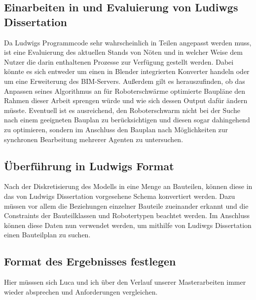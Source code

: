 \subsection{Einarbeiten in und Evaluierung von Ludiwgs Dissertation}
Da Ludwigs Programmcode sehr wahrscheinlich in Teilen angepasst werden muss, ist eine Evaluierung des aktuellen Stands von Nöten und in welcher Weise dem Nutzer die darin enthaltenen Prozesse zur Verfügung gestellt werden.
Dabei könnte es sich entweder um einen in Blender integrierten Konverter handeln oder um eine Erweiterung des BIM-Servers.
Außerdem gilt es herauszufinden, ob das Anpassen seines Algorithmus an für Roboterschwärme optimierte Baupläne den Rahmen dieser Arbeit sprengen würde und wie sich dessen Output dafür ändern müsste.
Eventuell ist es ausreichend, den Roboterschwarm nicht bei der Suche nach einem geeigneten Bauplan zu berücksichtigen und diesen sogar dahingehend zu optimieren, sondern im Anschluss den Bauplan nach Möglichkeiten zur synchronen Bearbeitung mehrerer Agenten zu untersuchen.

\subsection{Überführung in Ludwigs Format}
Nach der Diskretisierung des Modells in eine Menge an Bauteilen, können diese in das von Ludwigs Dissertation vorgesehene Schema konvertiert werden.
Dazu müssen vor allem die Beziehungen einzelner Bauteile zueinander erkannt und die Constraints der Bauteilklassen und Robotertypen beachtet werden.
Im Anschluss können diese Daten nun verwendet werden, um mithilfe von Ludiwgs Dissertation einen Bauteilplan zu suchen.

\subsection{Format des Ergebnisses festlegen}
Hier müsssen sich Luca und ich über den Verlauf unserer Masterarbeiten immer wieder absprechen und Anforderungen vergleichen.

